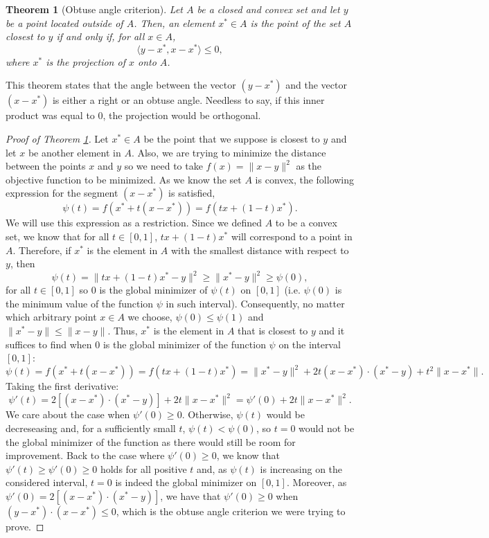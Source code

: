 \documentclass{article}
\newtheorem{thm}{Theorem}
\begin{document}
\begin{thm}[Obtuse angle criterion]\label{thm:obt}
Let $A$ be a closed and convex set and let $y$ be a point located outside of $A$. Then, an element $x^* \in A$ is the point of the set $A$ closest to $y$ if and only if, for all $x \in A$, 
\[
\langle y - x^*, x - x^* \rangle \leqslant 0,
\]
where $x^*$ is the projection of $x$ onto $A$.
\end{thm}
This theorem states that the angle between the vector $(y - x^*)$ and the vector $(x - x^*)$ is either a right or an obtuse angle. Needless to say, if this inner product was equal to 0, the projection would be orthogonal. 

\begin{proof}[Proof of Theorem \ref{thm:obt}]
Let $x^* \in A$ be the point that we suppose is closest to $y$ and let $x$ be another element in $A$. Also, we are trying to minimize the distance between the points $x$ and $y$ so we need to take $f(x) = \lVert x - y \rVert^2$ as the objective function to be minimized. As we know the set $A$ is convex, the following expression for the segment $(x - x^*)$ is satisfied, 
\[
\psi(t) = f(x^* + t(x - x^*)) = f(tx + (1-t)x^*).
\]
We will use this expression as a restriction. Since we defined $A$ to be a convex set, we know that for all $t \in [0,1]$, $tx + (1-t)x^*$ will correspond to a point in $A$. Therefore, if $x^*$ is the element in $A$ with the smallest distance with respect to $y$, then 
\[
\psi(t) = \lVert tx + (1-t)x^* - y \rVert^2 \geqslant \lVert x^* - y \rVert^2 \geqslant \psi(0),
\]
for all $t \in [0,1]$ so 0 is the global minimizer of $\psi(t)$ on $[0, 1]$ (i.e. $\psi(0)$ is the minimum value of the function $\psi$  in such interval). Consequently, no matter which arbitrary point $x \in A$ we choose, $\psi(0) \leqslant \psi(1)$ and $\lVert x^* - y \rVert \leqslant \lVert x - y \rVert$. Thus, $x^*$ is the element in $A$ that is closest to $y$ and it suffices to find when 0 is the global minimizer of the function $\psi$ on the interval $[0, 1]$:
\[
\psi(t) = f(x^* + t(x - x^*)) = f(tx + (1-t)x^*) = \lVert x^* - y \rVert^2 + 2t(x - x^*)\cdot(x^* - y) + t^2\lVert x - x^* \rVert. 
\]
Taking the first derivative:
\[
\psi'(t) = 2[(x - x^*)\cdot(x^* - y)] + 2t\lVert x - x^* \rVert^2 = \psi'(0) + 2t\lVert x - x^* \rVert^2. 
\]
We care about the case when $\psi'(0) \geqslant 0$. Otherwise, $\psi(t)$ would be decreseasing and, for a sufficiently small $t$, $\psi(t) < \psi(0)$, so $t=0$ would not be the global minimizer of the function as there would still be room for improvement. 
Back to the case where $\psi'(0) \geqslant 0$, we know that $\psi'(t) \geqslant \psi'(0) \geqslant 0$ holds for all positive $t$ and, as $\psi(t)$ is increasing on the considered interval, $t=0$ is indeed the global minimizer on $[0, 1]$.
Moreover, as $\psi'(0) = 2[(x - x^*)\cdot(x^* - y)]$, we have that $\psi'(0) \geqslant 0$ when $(y - x^*)\cdot(x - x^*) \leqslant 0$, which is the obtuse angle criterion we were trying to prove.
\end{proof}
\end{document}
